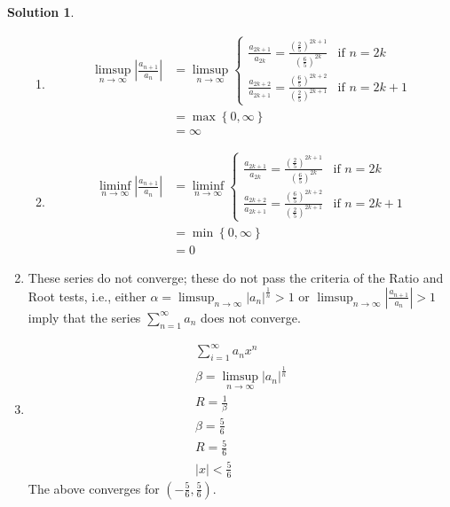 \documentclass[12pt]{article}
\theoremstyle{definition} %
\newtheorem{solution}{Solution}
\theoremstyle{plain} %
\begin{document}
\begin{solution}
\begin{enumerate}
\begin{enumerate}
              \item 
              \begin{align}
                 \limsup_{n \to \infty} \left| \frac{a_{n+1}}{a_n} \right| &= \limsup_{n \to \infty} 
                 \begin{cases}
                     \frac{a_{2k+1}}{a_{2k}} = \frac{\left(\frac{2}{5}\right)^{2k+1}}{\left(\frac{6}{5}\right)^{2k}} & \text{if } n = 2k \\
                     \frac{a_{2k+2}}{a_{2k+1}} = \frac{\left(\frac{6}{5}\right)^{2k+2}}{\left(\frac{2}{5}\right)^{2k+1}} & \text{if } n = 2k+1
                 \end{cases} \\[10pt]
                 &= \max \left\{ 0, \infty \right\} \\[10pt]
                 &= \infty
    \end{align}
    \item 
    \begin{align}
       \liminf_{n \to \infty} \left| \frac{a_{n+1}}{a_n} \right| &= \liminf_{n \to \infty} 
       \begin{cases}
           \frac{a_{2k+1}}{a_{2k}} = \frac{\left(\frac{2}{5}\right)^{2k+1}}{\left(\frac{6}{5}\right)^{2k}} & \text{if } n = 2k \\[10pt]
           \frac{a_{2k+2}}{a_{2k+1}} = \frac{\left(\frac{6}{5}\right)^{2k+2}}{\left(\frac{2}{5}\right)^{2k+1}} & \text{if } n = 2k+1
       \end{cases} \\[10pt]
       &= \min \left\{ 0, \infty \right\} \\[10pt]
       &= 0
    \end{align}
\end{enumerate}
\item These series do not converge; these do not pass the criteria of the Ratio and Root tests, i.e., either $\alpha = \limsup_{n \to \infty} \left\vert a_{n} \right\vert^{\frac{1}{n}}>1 $ or $\limsup_{n \to \infty} \left\vert \frac{a_{n+1}}{a_{n}}  \right\vert>1 $ imply that the series $\sum_{n=1}^{\infty} a_{n}$ does not converge.
\item 
\begin{align}    
\sum_{i=1}^{\infty} a_{n}x^{n} \\[10pt] 
\beta = \limsup_{n \to \infty} \left\vert a_{n} \right\vert^{\frac{1}{n}} \\[10pt] 
R = \frac{1}{\beta}\\[10pt] 
\beta = \frac{5}{6} \\[10pt] 
R = \frac{5}{6} \\[10pt] 
\left\vert x \right\vert < \frac{5}{6}
\end{align}
The above converges for $(-\frac{5}{6}, \frac{5}{6})$. 
   \end{enumerate} 
\end{solution}
\end{document}

